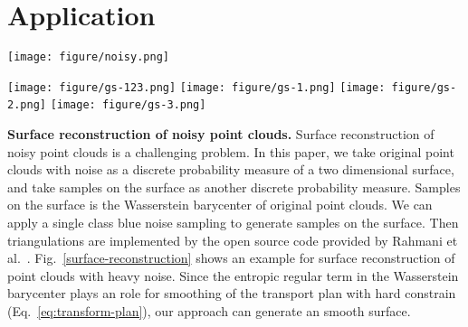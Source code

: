 \section{Application}

\begin{figure*}[htb]
  \centering

  \texttt{[image: figure/noisy.png]}
  \caption{Surface reconstruction of noisy point clouds.
  (a) is original point clouds with $8856$ points.
  (c) is mesh reconstruction result on $3946$ sampling points.
  (b) is rendering result with point clouds (a) and mesh model (c).
  (d) is the close-up view of (c) at the square mark.
   }\label{surface-reconstruction}
\end{figure*}

\begin{figure*}[htb]
  \centering
   \begin{minipage}{1\textwidth}
  \texttt{[image: figure/gs-123.png]}
  \texttt{[image: figure/gs-1.png]}
  \texttt{[image: figure/gs-2.png]}
  \texttt{[image: figure/gs-3.png]}
  \end{minipage}
  \caption{Object placement on a complex geometry model.
  The number of samples of each class is $200$, $1000$ and $1000$.}\label{gs-sampling}
\end{figure*}


\textbf{Surface reconstruction of noisy point clouds.}
Surface reconstruction of noisy point clouds is a challenging problem.
In this paper,
we take original point clouds with noise as a discrete probability measure of a two dimensional surface,
and take samples on the surface as another discrete probability measure.
Samples on the surface is the Wasserstein barycenter of original point clouds.
We can apply a single class blue noise sampling to generate samples on the surface.
Then triangulations are implemented by the open source code provided by Rahmani et al.~\cite{rahmani:2014:hopc}.
Fig.~\ref{surface-reconstruction} shows an example for surface reconstruction of point clouds with heavy noise.
Since the entropic regular term in the Wasserstein barycenter plays an role for smoothing of the transport plan with hard constrain (Eq.~\ref{eq:transform-plan}),
our approach can generate an smooth surface.

